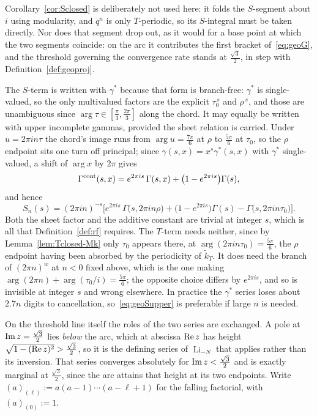 \documentclass[11pt]{article}
\newcommand{\tk}{\widetilde{k}_T}
\DeclareMathOperator{\Li}{Li}
\begin{document}
Corollary~\ref{cor:Sclosed} is deliberately not used here: it folds the $S$-segment about $i$ using
modularity, and $q^{n}$ is only $T$-periodic, so its $S$-integral must be taken directly. Nor does
that segment drop out, as it would for a base point at which the two segments coincide: on the arc
it contributes the first bracket of~\eqref{eq:geoG}, and the threshold governing the convergence
rate stands at $\tfrac{\sqrt3}{2}$, in step with Definition~\ref{def:geoproj}.

The $S$-term is written with $\gamma^*$ because that form is branch-free: $\gamma^*$ is
single-valued, so the only multivalued factors are the explicit $\tau_0^{\,s}$ and $\rho^{\,s}$,
and those are unambiguous since $\arg\tau\in[\tfrac{\pi}{3},\tfrac{2\pi}{3}]$ along the chord. It
may equally be written with upper incomplete gammas, provided the sheet relation is carried. Under
$u=2\pi in\tau$ the chord's image runs from $\arg u=\tfrac{7\pi}{6}$ at $\rho$ to
$\tfrac{5\pi}{6}$ at $\tau_0$, so the $\rho$ endpoint sits one turn off principal; since
$\gamma(s,x)=x^{s}\gamma^*(s,x)$ with $\gamma^*$ single-valued, a shift of $\arg x$ by $2\pi$ gives
\begin{equation}\label{eq:sheet}
\Gamma^{\rm cont}(s,x)=e^{2\pi is}\,\Gamma(s,x)+\big(1-e^{2\pi is}\big)\Gamma(s),
\end{equation}
and hence
\begin{equation}\label{eq:geoSupper}
S_n(s)=(2\pi in)^{-s}\Big[e^{2\pi is}\,\Gamma\big(s,2\pi in\rho\big)
+\big(1-e^{2\pi is}\big)\Gamma(s)-\Gamma\big(s,2\pi in\tau_0\big)\Big].
\end{equation}
Both the sheet factor and the additive constant are trivial at integer $s$, which is all that
Definition~\ref{def:rf} requires. The $T$-term needs neither, since by
Lemma~\ref{lem:Tclosed-Mk} only $\tau_0$ appears there, at $\arg(2\pi in\tau_0)=\tfrac{5\pi}{6}$,
the $\rho$ endpoint having been absorbed by the periodicity of $\tk$. It does need the branch of
$(2\pi n)^{w}$ at $n<0$ fixed above, which is the one making
$\arg(2\pi n)+\arg(\tau_0/i)=\tfrac{5\pi}{6}$; the opposite choice differs by $e^{2\pi is}$, and so
is invisible at integer $s$ and wrong elsewhere. In practice the $\gamma^*$
series loses about $2.7n$ digits to cancellation, so~\eqref{eq:geoSupper} is preferable if large
$n$ is needed.

On the threshold line itself the roles of the two series are exchanged. A pole at
${\rm Im}\,z=\tfrac{\sqrt3}{2}$ lies \emph{below} the arc, which at abscissa ${\rm Re}\,z$ has
height $\sqrt{1-({\rm Re}\,z)^{2}}>\tfrac{\sqrt3}{2}$, so it is the defining series of $\Li_{-N}$
that applies rather than its inversion. That series converges absolutely for
${\rm Im}\,z<\tfrac{\sqrt3}{2}$ and is exactly marginal at $\tfrac{\sqrt3}{2}$, since the arc
attains that height at its two endpoints. Write $(a)_{(\ell)}:=a(a-1)\cdots(a-\ell+1)$ for the
falling factorial, with $(a)_{(0)}:=1$.
\end{document}
